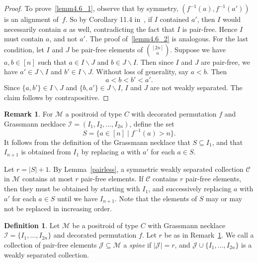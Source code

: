 \documentclass[10pt]{amsart}
\theoremstyle{definition}
\newtheorem{defi}[theo]{Definition}
\newtheorem{rema}[theo]{Remark}
\begin{document}
\begin{proof}
To prove~\eqref{lemm4.6_1}, observe that by symmetry, $(f^{-1}(a),f^{-1}(a'))$ is an alignment of~$f$. So by Corollary 11.4 in~\cite{OPS15}, if $I$ contained $a'$, then $I$ would necessarily contain $a$ as well, contradicting the fact that $I$ is pair-free. Hence $I$ must contain $a$, and not $a'$. The proof of~\eqref{lemm4.6_2} is analogous. For the last condition, let $I$ and $J$ be pair-free elements of $\binom{[2n]}{n}$. Suppose we have $a,b \in [n]$ such that $a \in I \backslash J$ and $b \in J \backslash I$. Then since $I$ and $J$ are pair-free, we have
$a' \in J \backslash I$ and $b' \in I \backslash J$. Without loss of generality, say $a < b$. Then
\[a < b < b' < a'.\]
Since $\{a,b'\} \in I \backslash J$ and $\{b,a'\} \in J \backslash I$, $I$ and $J$ are not weakly separated. The claim follows by contrapositive. 
\end{proof}

\begin{rema}
\label{explain_spine}
For $\mathcal{M}$ a positroid of type $C$ with decorated permutation $f$ and Grassmann necklace $\mathcal{I}= (I_1, I_2, \ldots, I_{2n})$, define the set
\begin{equation}
	S = \{a \in [n] \mid f^{-1}(a) > n\}.
\end{equation}
It follows from the definition of the Grassmann necklace that $S \subseteq I_1$, and that $I_{n+1}$ is obtained from $I_1$ by replacing $a$ with $a'$ for each $a \in S$.

Let $r = |S| + 1$. By Lemma~\ref{pairless}, a symmetric weakly separated collection $\mathcal{C}$ in $\mathcal{M}$ contains at most $r$ pair-free elements. If $\mathcal{C}$ contains $r$ pair-free elements, then they must be obtained by starting with $I_1$, and successively replacing $a$ with $a'$ for each $a \in S$ until we have $I_{n+1}$. Note that the elements of $S$ may or may not be replaced in increasing order.
\end{rema}

\begin{defi}
Let $\mathcal{M}$ be a positroid of type $C$ with Grassmann necklace $\mathcal{I}=\{I_1,\ldots,I_{2n}\}$ and decorated permutation $f$. Let $r$ be as in Remark~\ref{explain_spine}. We call a collection of pair-free elements $\mathcal{J} \subseteq \mathcal{M}$ a \emph{spine} if $|\mathcal{J}| = r$, and $\mathcal{J} \cup \{I_1,\ldots,I_{2n}\}$
is a weakly separated collection. 
\end{defi}
\end{document}

